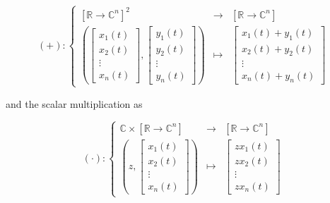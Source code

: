 \begin{equation} (+): \left\{\begin{array}{rcl} \left[\mathbb{R}\to\mathbb{C}^n\right]^2 &\to& \left[\mathbb{R}\to\mathbb{C}^n\right] \\[5mm] \left(\left[\begin{array}{c} x_1\left(t\right) \\[3mm] x_2(t) \\[3mm] \vdots \\[3mm] x_n(t) \end{array}\right],\left[\begin{array}{c} y_1\left(t\right) \\[3mm] y_2(t) \\[3mm] \vdots \\[3mm] y_n(t) \end{array}\right]\right) &\mapsto& \left[\begin{array}{c} x_1\left(t\right) + y_1\left(t\right) \\[3mm] x_2\left(t\right) + y_2\left(t\right) \\[3mm] \vdots \\[3mm] x_n\left(t\right) + y_n\left(t\right) \end{array}\right] \end{array}\right. \end{equation}

	\noindent and the scalar multiplication as

\begin{equation} (\cdot): \left\{\begin{array}{rcl} \mathbb{C}\times\left[\mathbb{R}\to\mathbb{C}^n\right] &\to& \left[\mathbb{R}\to\mathbb{C}^n\right] \\[5mm] \left(z,\left[\begin{array}{c} x_1\left(t\right) \\[3mm] x_2(t) \\[3mm] \vdots \\[3mm] x_n(t) \end{array}\right]\right) &\mapsto& \left[\begin{array}{c} zx_1\left(t\right) \\[3mm] zx_2\left(t\right) \\[3mm] \vdots \\[3mm] zx_n\left(t\right) \end{array}\right] \end{array}\right. \end{equation}

